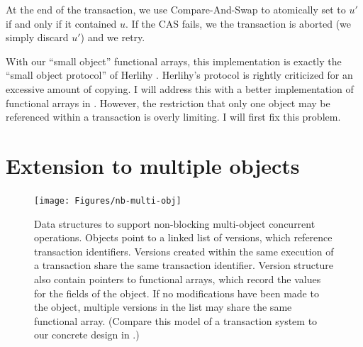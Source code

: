 At the end of the transaction, we use Compare-And-Swap to atomically
set  to $u'$ if and only if it contained $u$.  If the CAS fails,
we the transaction is aborted (we simply discard $u'$) and we retry.

With our \naive ``small object'' functional arrays, this implementation is
exactly the ``small object protocol'' of Herlihy \cite{Herlihy93}.
Herlihy's protocol is rightly criticized for an excessive amount of
copying.  I will address this with a better implementation of
functional arrays in .
However, the restriction that only one object
may be referenced within a transaction is overly limiting.  I will
first fix this problem.

\section{Extension to multiple objects}
\begin{figure}\centering
\texttt{[image: Figures/nb-multi-obj]}
\caption[Data structures to support non-blocking multi-object
  concurrent operations.]{Data structures to support non-blocking multi-object
  concurrent operations.  Objects point to a linked list of versions,
  which reference transaction identifiers.  Versions created within the
  same execution of a transaction share the same transaction
  identifier.  Version structure also contain pointers to functional
  arrays, which record the values for the fields of the object.
  If no modifications have been made to the object, multiple versions
  in the list may share the same functional array.  (Compare this model
  of a transaction system to our concrete design in .)}
\label{fig:multi-o}
\end{figure}
